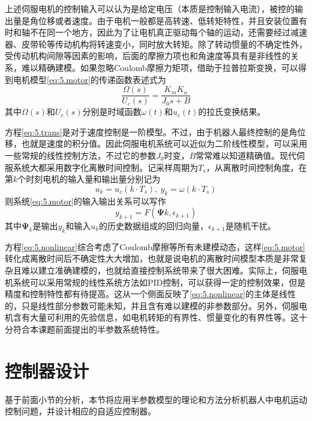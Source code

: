 上述伺服电机的控制输入可以认为是给定电压（本质是控制输入电流），被控的输出量是角位移或者速度。由于电机一般都是高转速、低转矩特性，并且安装位置有时和轴不在同一个地方，因此为了让电机真正驱动每个轴的运动，还需要经过减速器、皮带轮等传动机构将转速变小，同时放大转矩。除了转动惯量的不确定性外，受传动机构间隙等因素的影响，后面的摩擦力项也和角速度等具有是非线性的关系，难以精确建模。如果忽略Coulomb摩擦力矩项，借助于拉普拉斯变换，可以得到电机模型\eqref{eq:5.motor}的传递函数表述式为
\begin{equation}\label{eq:5.trans}
\frac{\Omega(s)}{U_{c}(s)}=\frac{K_{m}K_{a}}{J_{0}s+B}
\end{equation}
其中$\Omega(s)$和$U_{c}(s)$分别是时域函数$\omega(t)$和$u_{c}(t)$的拉氏变换结果。

方程\eqref{eq:5.trans}是对于速度控制是一阶模型。不过，由于机器人最终控制的是角位移，也就是速度的积分值。因此伺服电机系统可以近似为二阶线性模型，可以采用一些常规的线性控制方法，不过它的参数$J_{0}$时变，$B$常常难以知道精确值。现代伺服系统大都采用数字化离散时间控制。记采样周期为$T_{s}$，从离散时间控制角度，在第$k$个时刻电机的输入量和输出量分别记为
$$u_{k}=u_{c}(k\cdot T_{s}),\ y_{k}=\omega(k\cdot T_{s})$$
则系统\eqref{eq:5.motor}的输入输出关系可以写作
\begin{equation}\label{eq:5.nonlinear}
y_{k+1}=F(\bm{\Psi}{k},\epsilon_{k+1})
\end{equation}
其中$\bm{\Psi}_{k}$是输出$y_{k}$和输入$u_{k}$的历史数据组成的回归向量，$\epsilon_{k+1}$是随机干扰。

方程\eqref{eq:5.nonlinear}综合考虑了Coulomb摩擦等所有未建模动态，这样\eqref{eq:5.motor}转化成离散时间后不确定性大大增加，也就是说电机的离散时间模型本质是非常复杂且难以建立准确建模的，也就给直接控制系统带来了很大困难。实际上，伺服电机系统可以采用常规的线性系统方法如PID控制，可以获得一定的控制效果，但是精度和控制特性都有待提高。这从一个侧面反映了\eqref{eq:5.nonlinear}的主体是线性的，只是线性部分参数可能未知，并且含有难以建模的非参数部分。另外，伺服电机含有大量可利用的先验信息，如电机转矩的有界性、惯量变化的有界性等。这十分符合本课题前面提出的半参数系统特性。

\section{控制器设计}\label{chap:5.2}
基于前面小节的分析，本节将应用半参数模型的理论和方法分析机器人中电机运动控制问题，并设计相应的自适应控制器。
